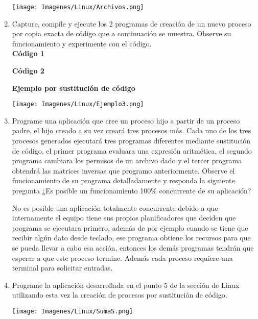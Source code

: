 \documentclass[12pt]{article}
\begin{document}
\begin{enumerate}
                 \begin{center}
                      \texttt{[image: Imagenes/Linux/Archivos.png]}
                 \end{center}
        \newpage
        \item Capture, compile y ejecute los 2 programas de creación de un nuevo proceso por copia exacta de código que a continuación se muestra. Observe su funcionamiento y experimente con el código.\\

             \textbf{Código 1}
            
            \textbf{Código 2}
            
            \textbf{Ejemplo por sustitución de código}
            \begin{center}
             \newpage   \texttt{[image: Imagenes/Linux/Ejemplo3.png]}
            \end{center}
        \item Programe una aplicación que cree un proceso hijo a partir de un proceso padre, el hijo creado a su vez creará tres procesos más. Cada uno de los tres procesos generados ejecutará tres programas diferentes mediante sustitución de código, el primer programa evaluara una expresión aritmética, el segundo programa cambiara los permisos de un archivo dado y el tercer programa obtendrá las matrices inversas que programo anteriormente. Observe el funcionamiento de su programa detalladamente y responda la siguiente pregunta ¿Es posible un funcionamiento 100\% concurrente de su aplicación?
        
        No es posible una aplicación totalmente concurrente debido a que internamente el equipo tiene sus propios planificadores que deciden que programa se ejecutara primero, además de por ejemplo cuando se tiene que recibir algún dato desde teclado, ese programa obtiene los recursos para que se pueda llevar a cabo esa acción, entonces los demás programas tendrán que esperar a que este proceso termine. Además cada proceso requiere una terminal para solicitar entradas. 

        
        \item Programe la aplicación desarrollada en el punto 5 de la sección de Linux utilizando esta vez la creación de procesos por sustitución de código.
        
        \begin{center}
                 \texttt{[image: Imagenes/Linux/SumaS.png]}\\
                \end{center}
                

\end{enumerate}
\end{document}
